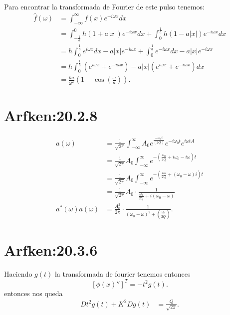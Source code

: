 \documentclass{report}
\begin{document}
Para encontrar la transformada de Fourier de este pulso tenemos:
\begin{align*}
  \hat{f}\left( \omega \right)  &= \int_{-\infty}^{\infty} f\left( x \right) e^{-i \omega x}dx \\
  &= \int_{-\frac{1}{a}}^{0}h\left( 1 + a\left| x \right|  \right) e^{-i\omega x} dx + \int_{0}^{\frac{1}{a}} h\left( 1 - a\left| x \right|  \right) e^{-i\omega x}dx\\
  &= h \int_{0}^{\frac{1}{a}}e^{i\omega x}dx - a\left| x \right|e^{-i \omega x} + \int_{0}^{\frac{1}{a}} e^{-i\omega x}dx - a\left| x \right|e^{-i \omega x}   \\
  &= h \int_{0}^{\frac{1}{a}} \left( e^{i\omega x}  + e^{-i \omega x} \right) - a \left| x \right| \left( e^{i\omega x}  + e^{-i \omega x} \right) dx \\
  &= \frac{h a}{\omega^2}\left( 1 - \cos\left( \frac{\omega}{a} \right)  \right)
.\end{align*}

\chapter{Arfken:20.2.8}

\begin{align*}
  a\left( \omega \right) &= \frac{1}{\sqrt{2\pi} }\int_{-\infty}^{\infty}A_0e^{\frac{-\omega_0t}{\left( 2Q \right) }}e^{-i\omega_0 t}e^{i\omega tA}\\
  &= \frac{1}{\sqrt{2\pi} }A_0\int_{-\infty}^{\infty}e^{-\left( \frac{\omega_0}{2Q} + i\omega_0 - i\omega \right)t } \\
  &= \frac{1}{\sqrt{2\pi} } A_0\int_{-\infty}^{\infty}e^{-\left( \frac{\omega_0}{2Q} + \left( \omega_0-\omega\right)i  \right)t } \\
  &= \frac{1}{\sqrt{2\pi} }A_0 \cdot \frac{1}{\frac{\omega_0}{2Q} + i\left( \omega_0 - \omega \right) } \\
  a^{*}\left( \omega \right)a\left( \omega \right)  &=  \frac{A_0^2}{2\pi } \cdot \frac{1}{\left( \omega_0 - \omega \right)^2 + \left( \frac{\omega_0}{2Q} \right) }
.\end{align*}

\chapter{Arfken:20.3.6}

Haciendo $g\left( t \right) $ la transformada de fourier tenemos entonces \[
\left[ \phi\left( x \right)'' \right]^{T} = -t^2g\left( t \right) 
.\] entonces nos queda 
\begin{align*}
  Dt^2 g\left( t \right) + K^2Dg\left( t \right) &= \frac{Q}{\sqrt{2\pi} }
.\end{align*}
\end{document}

